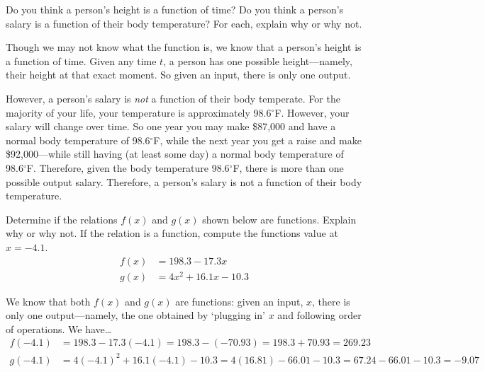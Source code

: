 \documentclass[11pt,letterpaper]{article}
\begin{document}

 Do you think a person's height is a function of time? Do you think a person's salary is a function of their body temperature? For each, explain why or why not. \pspace

\sol Though we may not know what the function is, we know that a person's height is a function of time. Given any time $t$, a person has one possible height---namely, their height at that exact moment. So given an input, there is only one output. \pspace

However, a person's salary is \textit{not} a function of their body temperate. For the majority of your life, your temperature is approximately 98.6$^\circ$F. However, your salary will change over time. So one year you may make \$87,000 and have a normal body temperature of 98.6$^\circ$F, while the next year you get a raise and make \$92,000---while still having (at least some day) a normal body temperature of 98.6$^\circ$F. Therefore, given the body temperature 98.6$^\circ$F, there is more than one possible output salary. Therefore, a person's salary is not a function of their body temperature. 



\newpage



 Determine if the relations $f(x)$ and $g(x)$ shown below are functions. Explain why or why not. If the relation is a function, compute the functions value at $x= -4.1$. 
	\[
	\begin{aligned}
	f(x)&= 198.3 - 17.3x \\[0.3cm]
	g(x)&= 4x^2 + 16.1x - 10.3
	\end{aligned}
	\] \pspace

\sol We know that both $f(x)$ and $g(x)$ are functions: given an input, $x$, there is only one output---namely, the one obtained by `plugging in' $x$ and following order of operations. We have\dots
	\[
	\begin{aligned}
	f(-4.1)&= 198.3 - 17.3(-4.1)= 198.3 - (-70.93)= 198.3 + 70.93= 269.23 \\[0.3cm]
	g(-4.1)&= 4(-4.1)^2 + 16.1(-4.1) - 10.3= 4(16.81) - 66.01 - 10.3= 67.24 - 66.01 - 10.3= -9.07
	\end{aligned}
	\]



\newpage
\end{document}
